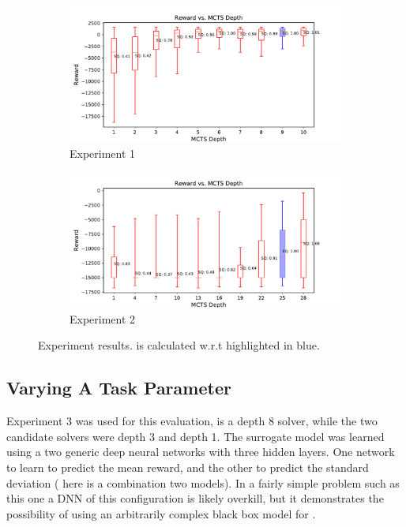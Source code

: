 \begin{figure}[tbp]
    \centering
    \begin{subfigure}[b]{0.98\linewidth}
        \centering
        \includegraphics[width=1.0\linewidth]{Figures/sq_roadnet_mcts_i100e1000.pdf}
        \vfill
        \caption{Experiment 1}
        \label{fig:mcts_d}
    \end{subfigure}%
    \hfill
    \begin{subfigure}[b]{0.98\linewidth}
        \centering
        \includegraphics[width=1.0\linewidth]{Figures/sq_mednet_mcts_i1000e2000.pdf}
        \caption{Experiment 2}
        \label{fig:mcts_d_med}
    \end{subfigure} 
    \caption{Experiment results. \xQ{} is calculated w.r.t \solvestar{} highlighted in blue.}
\end{figure}

\subsection{Varying A Task Parameter}
Experiment 3 was used for this evaluation, \solvestar{} is a depth 8 solver, while the two candidate solvers were depth 3 and depth 1. The surrogate model \surrogate{} was learned using a two generic deep neural networks  with three hidden layers. One network to learn to predict the mean reward, and the other to predict the standard deviation (\surrogate{} here is a combination two models). In a fairly simple problem such as this one a DNN of this configuration is likely overkill, but it demonstrates the possibility of using an arbitrarily complex black box model for \surrogate.

